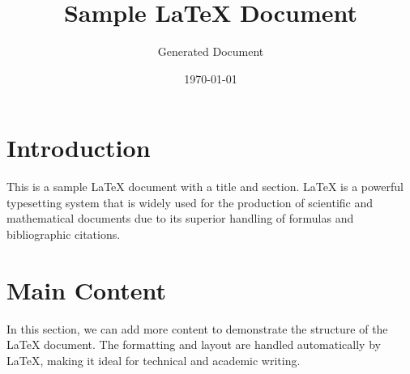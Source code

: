 \documentclass{article}
\title{Sample LaTeX Document}
\author{Generated Document}
\date{\today}
\begin{document}
\maketitle

\section{Introduction}
This is a sample LaTeX document with a title and section. LaTeX is a powerful typesetting system that is widely used for the production of scientific and mathematical documents due to its superior handling of formulas and bibliographic citations.

\section{Main Content}
In this section, we can add more content to demonstrate the structure of the LaTeX document. The formatting and layout are handled automatically by LaTeX, making it ideal for technical and academic writing.
\end{document}
